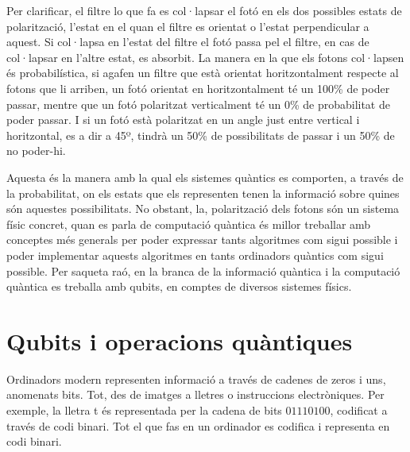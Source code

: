 Per clarificar, el filtre lo que fa es col·lapsar el fotó en els dos possibles estats de polarització, l'estat en el quan el filtre es orientat o l'estat perpendicular a aquest. Si col·lapsa en l'estat del filtre el fotó passa pel el filtre, en cas de col·lapsar en l'altre estat, es absorbit. La manera en la que els fotons col·lapsen és probabilística, si agafen un filtre que està orientat horitzontalment respecte al fotons que li arriben, un fotó orientat en horitzontalment té un 100\% de poder passar, mentre que un fotó polaritzat verticalment té un 0\% de probabilitat de poder passar. I si un fotó està polaritzat en un angle just entre vertical i horitzontal, es a dir a 45º, tindrà un 50\% de possibilitats de passar i un 50\% de no poder-hi. 

Aquesta és la manera amb la qual els sistemes quàntics es comporten, a través de la probabilitat, on els estats que els representen tenen la informació sobre quines són aquestes possibilitats. 
No obstant, la, polarització dels fotons són un sistema físic concret, quan es parla de computació quàntica és millor treballar amb conceptes més generals per poder expressar tants algoritmes com sigui possible i poder implementar aquests algoritmes en tants ordinadors quàntics com sigui possible. Per saqueta raó, en la branca de la informació quàntica i la computació quàntica es treballa amb qubits, en comptes de diversos sistemes físics. 

\section{Qubits i operacions quàntiques}
Ordinadors modern representen informació a través de cadenes de zeros i uns, anomenats bits. Tot, des de imatges a lletres o instruccions electròniques. Per exemple, la lletra t és representada per la cadena de bits $01110100$, codificat a través de codi binari. Tot el que fas en un ordinador es codifica i representa en codi binari. 

